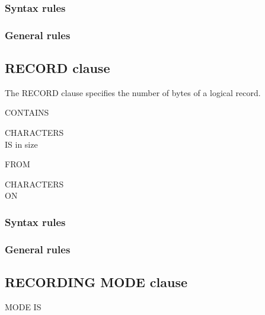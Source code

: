 \subsubsection{Syntax rules}

\subsubsection{General rules}

\subsection{RECORD clause}

The RECORD clause specifies the number of bytes of a logical record.

\begin{syntax}
  \begin{1=}
    CONTAINS \integer
    \begin{0-1}
       \integer
    \end{0-1}
    CHARACTERS \\
    IS  in size
    \begin{0-1}
      FROM \integer
    \end{0-1}
    \begin{0-1}
       \integer
    \end{0-1}
    CHARACTERS \\\qquad
     ON \identifier
  \end{1=}
\end{syntax}

\subsubsection{Syntax rules}

\subsubsection{General rules}

\subsection{RECORDING MODE clause}

\begin{syntax}[\deletedcolour]
   MODE IS
  \begin{1=}
    \begin{1=}
       \\
       \\
    \end{1=} \\

    \begin{1=}
       \\
       \\
    \end{1=} \\

     \\
  \end{1=}
\end{syntax}

